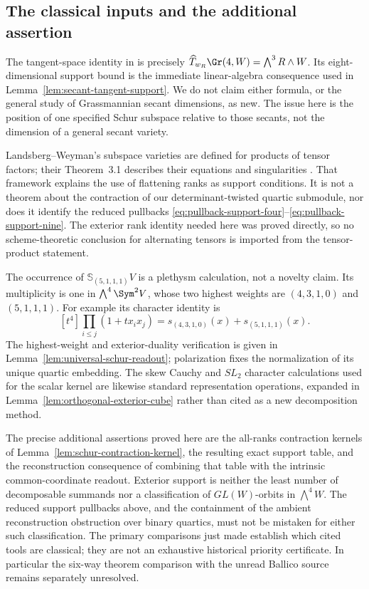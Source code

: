 \subsection{The classical inputs and the additional assertion}

The tangent-space identity in \cite[Lemma~2.1]{Boralevi} is precisely
\(\widehat T_{w_R}\Gr(4,W)=\bigwedge^3R\wedge W\).
Its eight-dimensional support bound is the immediate linear-algebra
consequence used in Lemma~\ref{lem:secant-tangent-support}.
We do not claim either formula, or the general study of Grassmannian
secant dimensions, as new.  The issue here is the position of one
specified Schur subspace relative to those secants, not the dimension
of a general secant variety.

Landsberg--Weyman's subspace varieties are defined for products of
tensor factors; their Theorem~3.1 describes their equations and
singularities \cite{LandsbergWeyman}.  That framework explains the
use of flattening ranks as support conditions.  It is not a theorem
about the contraction of our determinant-twisted quartic submodule,
nor does it identify the reduced pullbacks
\eqref{eq:pullback-support-four}--\eqref{eq:pullback-support-nine}.
The exterior rank identity needed here was proved directly, so no
scheme-theoretic conclusion for alternating tensors is imported from
the tensor-product statement.

The occurrence of \(\mathbb S_{(5,1,1,1)}V\) is a plethysm
calculation, not a novelty claim.  Its multiplicity is one in
\(\bigwedge^4\Sym^2V\), whose two highest weights are
\((4,3,1,0)\) and \((5,1,1,1)\).  For example its character
identity is
\[
 [t^4]\prod_{i\le j}(1+t x_ix_j)
       =s_{(4,3,1,0)}(x)+s_{(5,1,1,1)}(x).
\]
The highest-weight and exterior-duality verification is given in
Lemma~\ref{lem:universal-schur-readout}; polarization fixes the
normalization of its unique quartic embedding.  The skew Cauchy and
\(SL_2\) character calculations used for the scalar kernel are likewise
standard representation operations, expanded in
Lemma~\ref{lem:orthogonal-exterior-cube} rather than cited as a
new decomposition method.

The precise additional assertions proved here are the all-ranks
contraction kernels of Lemma~\ref{lem:schur-contraction-kernel},
the resulting exact support table, and the reconstruction consequence
of combining that table with the intrinsic common-coordinate
readout.  Exterior support is neither the least number of decomposable
summands nor a classification of \(GL(W)\)-orbits in
\(\bigwedge^4W\).  The reduced support pullbacks above, and the
containment of the ambient reconstruction obstruction over binary
quartics, must not be mistaken for either such classification.
The primary comparisons just made establish which cited tools are
classical; they are not an exhaustive historical priority certificate.
In particular the six-way theorem comparison with the unread
Ballico source \cite{Ballico93} remains separately unresolved.

